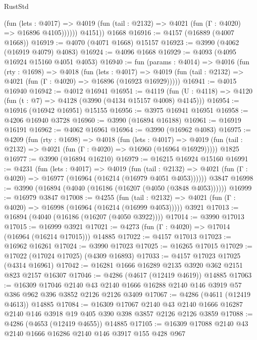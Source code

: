 \begin{lexlean}{RustStd}
\begin{coremodule}
              (fun (lets : @4017) =>
              @4019 (fun (tail : @2132) => @4021 (fun (Γ : @4020) => @16896 @4105))))))
        @4151))
    @1668
@16916 := @4157 (@16889 (@4007 @1668))
@16919 := @4070 (@4071 @1668) @15157
@16923 := @3990 (@4062 (@16919 @4079) @4083)
@16924 := @4096 @1668
@16929 := @4093 (@4095 @16924 @15160 @4051 @4053)
@16940 := fun (params : @4014) =>
  @4016
    (fun (rty : @1698) =>
    @4018
      (fun (lets : @4017) =>
      @4019 (fun (tail : @2132) => @4021 (fun (Γ : @4020) => @16896 (@16923 @16929)))))
@16941 := @4015 @16940
@16942 := @4012 @16941
@16951 := @4119
    (fun (U : @4118) => @4120 (fun (t : @7) => @4128 (@3990 (@4134 @15157 @4008) @4145)))
@16954 := @16916 (@16942 @16951) @15155
@16956 := @3975 @16941 @16951
@16958 := @4206 @16940 @3728
@16960 := @3990 (@16894 @16188)
@16961 := @16919 @16191
@16962 := @4062 @16961
@16964 := @3990 (@16962 @4083)
@16975 := @4209
    (fun (rty : @1698) =>
    @4018
      (fun (lets : @4017) =>
      @4019 (fun (tail : @2132) => @4021 (fun (Γ : @4020) => @16960 (@16964 @16929)))))
    @1825
@16977 := @3990 (@16894 @16210)
@16979 := @16215 @16924 @15160
@16991 := @4231
    (fun (lets : @4017) =>
    @4019
      (fun (tail : @2132) =>
      @4021 (fun (Γ : @4020) => @16977 (@16964 (@16214 (@16979 @4051 @4053))))))
    @3847
@16998 := @3990 (@16894 (@4040 (@16186 (@16207 (@4050 (@3848 @4053))))))
@16999 := @16979 @3847
@17008 := @4255
    (fun (tail : @2132) => @4021 (fun (Γ : @4020) => @16998 (@16964 (@16214 (@16999 @4053)))))
    @3921
@17013 := @16894 (@4040 (@16186 (@16207 (@4050 @3922))))
@17014 := @3990 @17013
@17015 := @16999 @3921
@17021 := @4273 (fun (Γ : @4020) => @17014 (@16964 (@16214 @17015))) @14885
@17022 := @4157 @17013
@17023 := @16962 @16261
@17024 := @3990 @17023
@17025 := @16265 @17015
@17029 := @17022 (@17024 @17025) (@4309 @16893)
@17033 := @4157 @17023 @17025 (@4314 @16961)
@17042 := @16281 @1666 @16289 @2135 @3920 @362 @2151 @823 @2157 @16307
@17046 := @4286 (@4617 (@12419 @4619)) @14885
@17063 := @16309
    @17046
    @2140
    @43
    @2140
    @1666
    @16288
    @2140
    @146
    @3919
    @57
    @386
    @962
    @396
    @3852
    @2126
    @2126
    @3409
@17067 := @4286 (@4611 (@12419 @4613)) @14885
@17084 := @16309
    @17067
    @2140
    @43
    @2140
    @1666
    @16287
    @2140
    @146
    @3918
    @19
    @405
    @390
    @398
    @3857
    @2126
    @2126
    @3859
@17088 := @4286 (@4653 (@12419 @4655)) @14885
@17105 := @16309
    @17088
    @2140
    @43
    @2140
    @1666
    @16286
    @2140
    @146
    @3917
    @155
    @428
    @967

\end{coremodule}
\end{lexlean}
